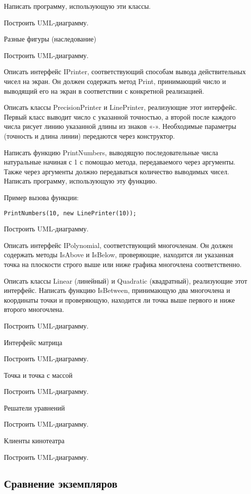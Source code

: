 Написать программу, использующую эти классы.

Построить UML-диаграмму.

\task Разные фигуры (наследование)

Построить UML-диаграмму.

\task Описать интерфейс IPrinter, соответствующий способам вывода
действительных чисел на экран. Он должен содержать метод Print,
принимающий число и выводящий его на экран в соответствии с конкретной
реализацией.

Описать классы PrecisionPrinter и LinePrinter, реализующие этот
интерфейс. Первый класс выводит число с указанной точностью, а второй
после каждого числа рисует линию указанной длины из знаков
«-». Необходимые параметры (точность и длина линии) передаются через
конструктор.

Написать функцию PrintNumbers, выводящую последовательные числа
натуральные начиная с 1 с помощью метода, передаваемого через
аргументы. Также через аргументы должно передаваться количество
выводимых чисел. Написать программу, использующую эту функцию.

Пример вызова функции:
\begin{lstlisting}[numbers=none]
PrintNumbers(10, new LinePrinter(10));
\end{lstlisting}

Построить UML-диаграмму.

\task Описать интерфейс IPolynomial, соответствующий многочленам. Он
должен содержать методы IsAbove и IsBelow, проверяющие, находится ли
указанная точка на плоскости строго выше или ниже графика многочлена
соответственно.

Описать классы Linear (линейный) и Quadratic (квадратный), реализующие
этот интерфейс. Написать функцию IsBetween, принимающую два многочлена
и координаты точки и проверяющую, находится ли точка выше первого и
ниже второго многочлена.

Построить UML-диаграмму.

\task Интерфейс матрица

Построить UML-диаграмму.

\task Точка и точка с массой

Построить UML-диаграмму.

\task Решатели уравнений

Построить UML-диаграмму.

\task Клиенты кинотеатра

Построить UML-диаграмму.


\subsection{Сравнение экземпляров}

